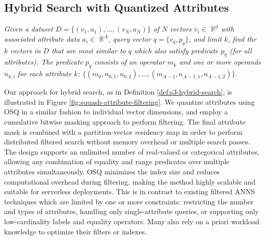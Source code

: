 \subsection{Hybrid Search with Quantized Attributes}
\label{ss:2.3-attribute-filtering}

\begin{definition}
\textit{Given a dataset $D = \{ (v_1, a_1), \dots, (v_N, a_N) \}$ of $N$ vectors $v_i \in$ $\mathbb{R}^d$ with associated attribute data $a_i \in$ $\mathbb{R}^A$, query vector $q = \{v_q , p_q \}$, and limit $k$, find the $k$ vectors in $D$ that are most similar to $q$ which also satisfy predicate $p_q$ (for all attributes). The predicate $p_q$ consists of an operator $m_k$ and one or more operands $n_{k,l}$ for each attribute $k$: $\{(m_0, n_{0,1}, n_{0,2}), \dots, (m_{A-1}, n_{A-1, 1}, n_{A-1, 2}) \}$}.
\label{def:s3-hybrid-search}
\end{definition}



Our approach for hybrid search, as in Definition \ref{def:s3-hybrid-search}, is illustrated in Figure \ref{fig:squash-attribute-filtering}. We quantize attributes using OSQ in a similar fashion to individual vector dimensions, and employ a cumulative bitwise masking approach to perform filtering.
The final attribute mask is combined with a partition-vector residency map in order to perform distributed filtered search without memory overhead or multiple search passes. The design supports an unlimited number of real-valued or categorical attributes, allowing any combination of equality and range predicates over multiple attributes simultaneously. OSQ minimizes the index size and reduces computational overhead during filtering, making the method highly scalable and suitable for serverless deployments.  This is in contrast to existing filtered ANNS techniques which are limited by one or more constraints: restricting the number and types of attributes, handling only single-attribute queries, or supporting only low-cardinality labels and equality operators. Many also rely on a priori workload knowledge to optimize their filters or indexes. 




